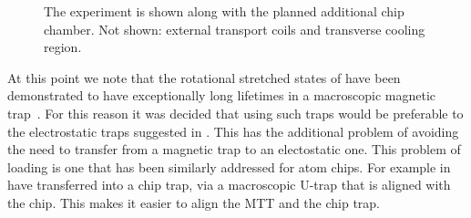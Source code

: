 \begin{figure}[htb]
  \centering
  \caption{
    The \CaF{} experiment is shown along with the planned additional chip
    chamber. Not shown: external transport coils and transverse cooling region.}
  \label{overview:fig:vacuumsystem}
\end{figure}

At this point we note that the rotational stretched states of \CaF{} have been
demonstrated to have exceptionally long lifetimes in a macroscopic magnetic
trap~\cite{WilliamsMagnetic2018}. For this reason it was decided that using such traps would be
preferable to the electrostatic traps suggested in . This
has the additional problem of avoiding the need to transfer from a magnetic
trap to an electostatic one. This problem of loading is one that has been
similarly addressed for atom chips. For example in  
have transferred  into a chip trap,
via a macroscopic U-trap that is aligned with the chip. This makes it easier to
align the MTT and the chip trap.

